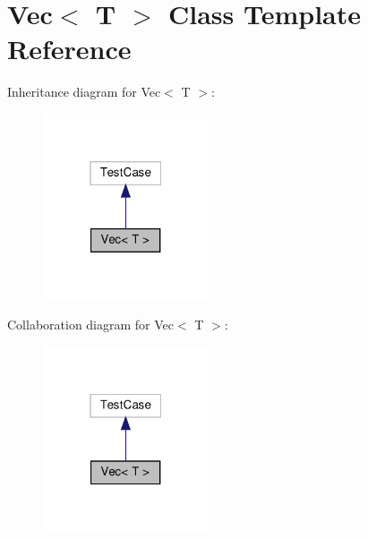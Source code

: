 \hypertarget{classVec}{}\section{Vec$<$ T $>$ Class Template Reference}
\label{classVec}


Inheritance diagram for Vec$<$ T $>$\+:\nopagebreak
\begin{figure}[H]
\begin{center}
\leavevmode
\includegraphics[width=139pt]{classVec__inherit__graph}
\end{center}
\end{figure}


Collaboration diagram for Vec$<$ T $>$\+:\nopagebreak
\begin{figure}[H]
\begin{center}
\leavevmode
\includegraphics[width=139pt]{classVec__coll__graph}
\end{center}
\end{figure}
